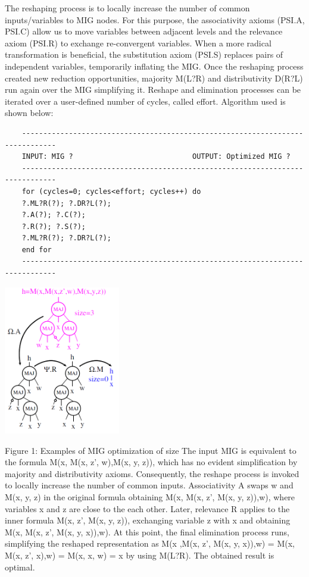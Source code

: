 \documentclass[
	accentcolor=1c,%
	type=intern,
	marginpar=false,
	ruledheaders=section,
	class=report,
	BCOR=5mm,
      parskip=half-,
	fontsize=10pt
	]{tudapub}
\begin{document}
		The reshaping process is to locally increase the number of common inputs/variables to MIG nodes. For this purpose, the associativity axioms (PSI.A, PSI.C) allow us to move variables between adjacent levels and the relevance axiom (PSI.R) to exchange re-convergent variables. When a more radical transformation is beneficial, the substitution axiom (PSI.S) replaces pairs of independent variables, temporarily inflating the MIG. Once the reshaping process created new reduction opportunities, majority M(L?R) and distributivity D(R?L) run again over the MIG simplifying it. Reshape and elimination processes can be iterated over a user-defined number of cycles, called effort.
		Algorithm used is shown below:\newline
	\begin{verbatim}
	------------------------------------------------------------------------------
	INPUT: MIG ? 							OUTPUT: Optimized MIG ?
	------------------------------------------------------------------------------
	for (cycles=0; cycles<effort; cycles++) do
	?.ML?R(?); ?.DR?L(?);
	?.A(?); ?.C(?);
	?.R(?); ?.S(?);
	?.ML?R(?); ?.DR?L(?);
	end for
	------------------------------------------------------------------------------
	\end{verbatim}

	\begin{center}
		\includegraphics [width=2in]{example_size.png}
	\end{center}
	\centering Figure 1: Examples of MIG optimization of size
		The input MIG is equivalent to the formula M(x, M(x, z', w),M(x, y, z)), which has no evident simplification by majority and distributivity axioms. Consequently, the reshape process is invoked to locally increase the number of common inputs. Associativity A swaps w and M(x, y, z) in the original formula obtaining M(x, M(x, z', M(x, y, z)),w), where variables x and z are close to the each other. Later, relevance R applies to the inner formula M(x, z', M(x, y, z)), exchanging variable z with x and obtaining M(x, M(x, z', M(x, y, x)),w). At this point, the final elimination process runs, simplifying the reshaped representation as M(x ,M(x, z', M(x, y, x)),w) = M(x, M(x, z', x),w) = M(x, x, w) = x by using M(L?R). The obtained result is optimal.
\end{document}
